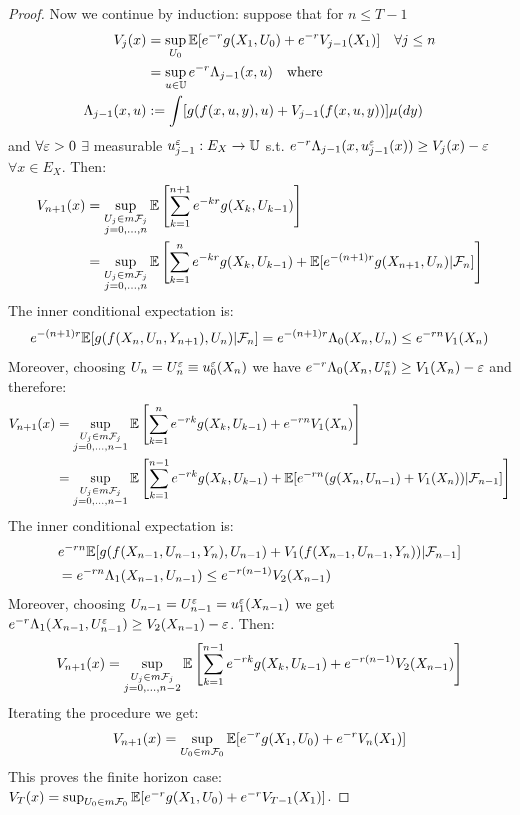 \begin{proof}
    Now we continue by induction: suppose that for $n \leq T-1$
    \begin{align*}
        V_j(x) &= \sup_{U_0} \mathbb E[e^{-r} g(X_1, U_0) + e^{-r} V_{j-1}(X_1)] \quad \forall j \leq n \\
        &= \sup_{u \in \mathbb{U}} e^{-r} \Lambda_{j-1}(x, u) \quad \text{where} \\
        \Lambda_{j-1}(x, u) &:= \int [g(f(x, u, y), u) + V_{j-1}(f(x, u, y))] \mu(dy)
    \end{align*}
    and $\forall \varepsilon > 0$ $\exists$ measurable $u_{j-1}^\varepsilon: E_X \to \mathbb{U}$ s.t. $e^{-r} \Lambda_{j-1}(x, u_{j-1}^\varepsilon(x)) \geq V_j(x) - \varepsilon$ $\forall x \in E_X$.
    Then:
    \begin{align*}
        V_{n+1}(x) &= \sup_{\substack{U_j \in m\mathcal{F}_j \\ j=0, \dots, n}} \mathbb E \left[ \sum_{k=1}^{n+1} e^{-kr} g(X_k, U_{k-1}) \right] \\
        &= \sup_{\substack{U_j \in m\mathcal{F}_j \\ j=0, \dots, n}} \mathbb E \left[ \sum_{k=1}^n e^{-kr} g(X_k, U_{k-1}) + \mathbb E[e^{-(n+1)r} g(X_{n+1}, U_n) | \mathcal{F}_n] \right]
    \end{align*}
    The inner conditional expectation is:
    \[ e^{-(n+1)r} \mathbb E[g(f(X_n, U_n, Y_{n+1}), U_n) | \mathcal{F}_n] = e^{-(n+1)r} \Lambda_0(X_n, U_n) \leq e^{-rn} V_1(X_n) \]
    Moreover, choosing $U_n = U_n^\varepsilon \equiv u_0^\varepsilon(X_n)$ we have $e^{-r} \Lambda_0(X_n, U_n^\varepsilon) \geq V_1(X_n) - \varepsilon$ and therefore:
    \begin{align*}
        V_{n+1}(x) &= \sup_{\substack{U_j \in m\mathcal{F}_j \\ j=0, \dots, n-1}} \mathbb E \left[ \sum_{k=1}^n e^{-rk} g(X_k, U_{k-1}) + e^{-rn} V_1(X_n) \right] \\
        &= \sup_{\substack{U_j \in m\mathcal{F}_j \\ j=0, \dots, n-1}} \mathbb E \left[ \sum_{k=1}^{n-1} e^{-rk} g(X_k, U_{k-1}) + \mathbb E[e^{-rn} (g(X_n, U_{n-1}) + V_1(X_n)) | \mathcal{F}_{n-1}] \right]
    \end{align*}
    The inner conditional expectation is:
    \begin{align*}
        &e^{-rn} \mathbb E[g(f(X_{n-1}, U_{n-1}, Y_n), U_{n-1}) + V_1(f(X_{n-1}, U_{n-1}, Y_n)) | \mathcal{F}_{n-1}] \\
        &= e^{-rn} \Lambda_1(X_{n-1}, U_{n-1}) \leq e^{-r(n-1)} V_2(X_{n-1})
    \end{align*}
    Moreover, choosing $U_{n-1} = U_{n-1}^\varepsilon = u_1^\varepsilon(X_{n-1})$ we get $e^{-r} \Lambda_1(X_{n-1}, U_{n-1}^\varepsilon) \geq V_2(X_{n-1}) - \varepsilon$.
    Then:
    \[ V_{n+1}(x) = \sup_{\substack{U_j \in m\mathcal{F}_j \\ j=0, \dots, n-2}} \mathbb E \left[ \sum_{k=1}^{n-1} e^{-rk} g(X_k, U_{k-1}) + e^{-r(n-1)} V_2(X_{n-1}) \right] \]
    Iterating the procedure we get:
    \[ V_{n+1}(x) = \sup_{U_0 \in m\mathcal{F}_0} \mathbb E[e^{-r} g(X_1, U_0) + e^{-r} V_n(X_1)] \]
    This proves the finite horizon case: $V_T(x) = \sup_{U_0 \in m\mathcal{F}_0} \mathbb E[e^{-r} g(X_1, U_0) + e^{-r} V_{T-1}(X_1)]$.


\end{proof}
